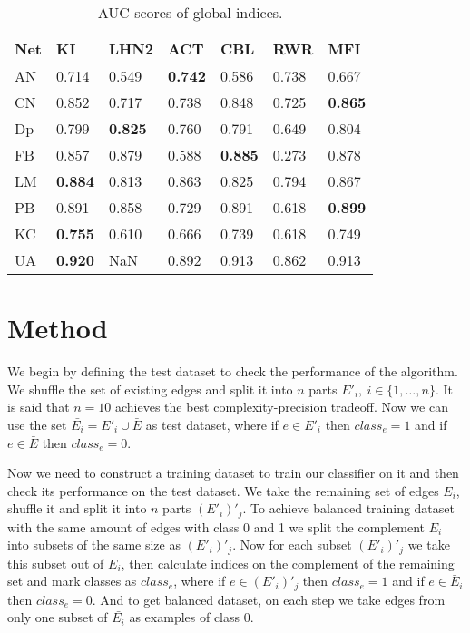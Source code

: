 \documentclass{llncs}
\begin{document}
%
\setlength{\tabcolsep}{5pt}
\renewcommand{\arraystretch}{1.5}
\begin{table}
\begin{center}
\caption{AUC scores of global indices.}
\begin{tabular}{| l | l | l | l | l | l | l |}
\hline
Net & KI & LHN2 & ACT & CBL & RWR & MFI \\ \hline
AN & 0.714 & 0.549 & \textbf{0.742} & 0.586 & 0.738 & 0.667 \\ \hline
CN & 0.852 & 0.717 & 0.738 & 0.848 & 0.725 & \textbf{0.865} \\ \hline
Dp & 0.799 & \textbf{0.825} & 0.760 & 0.791 & 0.649 & 0.804 \\ \hline
FB & 0.857 & 0.879 & 0.588 & \textbf{0.885} & 0.273 & 0.878 \\ \hline
LM & \textbf{0.884} & 0.813 & 0.863 & 0.825 & 0.794 & 0.867 \\ \hline
PB & 0.891 & 0.858 & 0.729 & 0.891 & 0.618 & \textbf{0.899} \\ \hline
KC & \textbf{0.755} & 0.610 & 0.666 & 0.739 & 0.618 & 0.749 \\ \hline
UA & \textbf{0.920} & NaN & 0.892 & 0.913 & 0.862 & 0.913 \\ 
\hline
\end{tabular}
\end{center}
\end{table}
%
\section{Method}
%
We begin by defining the test dataset to check the performance of the algorithm. We shuffle the set of existing edges and split it into $n$ parts $E'_i, \ i \in \{1, \ldots, n\}$. It is said that $n = 10$ achieves the best complexity-precision tradeoff. Now we can use the set $\bar{E_i} = E'_i \cup \bar{E}$ as test dataset, where if $e \in E'_i$ then $class_e = 1$ and if $e \in \bar{E}$ then $class_e = 0$.

Now we need to construct a training dataset to train our classifier on it and then check its performance on the test dataset. We take the remaining set of edges $E_i$, shuffle it and split it into $n$ parts $(E'_i)'_j$. To achieve balanced training dataset with the same amount of edges with class 0 and 1 we split the complement $\bar{E_i}$ into subsets of the same size as $(E'_i)'_j$. Now for each subset $(E'_i)'_j$ we take this subset out of $E_i$, then calculate indices on the complement of the remaining set and mark classes as $class_e$, where if $e \in (E'_i)'_j$ then $class_e = 1$ and if $e \in \bar{E}_i$ then $class_e = 0$. And to get balanced dataset, on each step we take edges from only one subset of $\bar{E_i}$ as examples of class 0.
\end{document}
